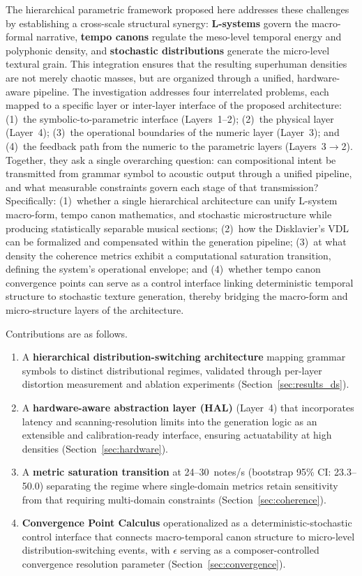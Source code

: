 \documentclass[a4paper]{article}
\theoremstyle{definition}
\theoremstyle{remark}
\begin{document}
The hierarchical parametric framework proposed here addresses these challenges by establishing a cross-scale structural synergy: \textbf{L-systems} govern the macro-formal narrative, \textbf{tempo canons} regulate the meso-level temporal energy and polyphonic density, and \textbf{stochastic distributions} generate the micro-level textural grain. This integration ensures that the resulting superhuman densities are not merely chaotic masses, but are organized through a unified, hardware-aware pipeline. The investigation addresses four interrelated problems, each mapped to a specific layer or inter-layer interface of the proposed architecture: (1)~the symbolic-to-parametric interface (Layers~1--2); (2)~the physical layer (Layer~4); (3)~the operational boundaries of the numeric layer (Layer~3); and (4)~the feedback path from the numeric to the parametric layers (Layers~3$\rightarrow$2). Together, they ask a single overarching question: can compositional intent be transmitted from grammar symbol to acoustic output through a unified pipeline, and what measurable constraints govern each stage of that transmission? Specifically: (1)~whether a single hierarchical architecture can unify L-system macro-form, tempo canon mathematics, and stochastic microstructure while producing statistically separable musical sections; (2)~how the Disklavier's VDL can be formalized and compensated within the generation pipeline; (3)~at what density the coherence metrics exhibit a computational saturation transition, defining the system's operational envelope; and
 (4)~whether tempo canon convergence points can serve as a control interface linking deterministic temporal structure to stochastic texture generation, thereby bridging the macro-form and micro-structure layers of the architecture.

Contributions are as follows.

\begin{enumerate}
    \item A \textbf{hierarchical distribution-switching architecture} mapping grammar symbols to distinct distributional regimes, validated through per-layer distortion measurement and ablation experiments (Section~\ref{sec:results_ds}).
    \item A \textbf{hardware-aware abstraction layer (HAL)} (Layer~4) that incorporates latency and scanning-resolution limits into the generation logic as an extensible and calibration-ready interface, ensuring actuatability at high densities (Section~\ref{sec:hardware}).
    \item A \textbf{metric saturation transition} at 24--30~notes/s (bootstrap 95\% CI: 23.3--50.0) separating the regime where single-domain metrics retain sensitivity from that requiring multi-domain constraints (Section~\ref{sec:coherence}).
    \item \textbf{Convergence Point Calculus} operationalized as a deterministic-stochastic control interface that connects macro-temporal canon structure to micro-level distribution-switching events, with $\epsilon$ serving as a composer-controlled convergence resolution parameter (Section~\ref{sec:convergence}).
\end{enumerate}
\end{document}
